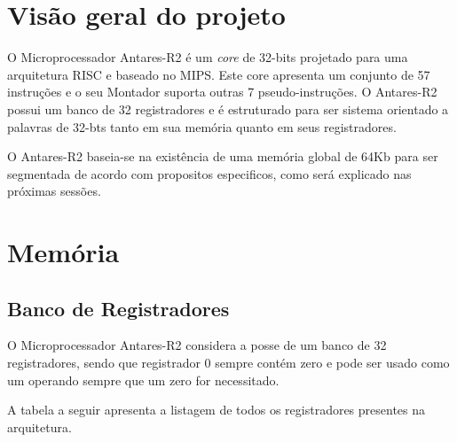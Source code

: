 \documentclass{report}
\begin{document}
\section{Visão geral do projeto}

O Microprocessador Antares-R2 é um \textit{core} de 32-bits projetado para uma arquitetura RISC e baseado no MIPS. Este core apresenta um conjunto de 57 instruções e o seu Montador suporta outras 7 pseudo-instruções. O Antares-R2 possui um banco de 32 registradores e é estruturado para ser sistema orientado a palavras de 32-bts tanto em sua memória quanto em seus registradores. 

O Antares-R2 baseia-se na existência de uma memória global de 64Kb para ser segmentada de acordo com propositos especificos, como será explicado nas próximas sessões.

\section{Memória}
\subsection{Banco de Registradores}

O Microprocessador Antares-R2 considera a posse de um banco de 32 registradores, sendo que registrador 0 sempre contém zero e pode ser usado como um operando sempre que um zero for necessitado.

A tabela a seguir apresenta a listagem de todos os registradores presentes na arquitetura.
\end{document}
